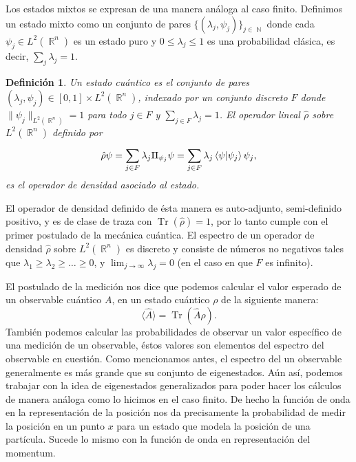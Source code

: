 \documentclass[a4paper]{report}
\DeclareMathOperator{\R}{\mathbb{R}}
\DeclareMathOperator{\N}{\mathbb{N}}
\DeclareMathOperator{\Tr}{Tr}
\newtheorem{definition}{Definición}
\begin{document}
  Los estados mixtos se expresan de una manera análoga al
  caso finito. Definimos un estado mixto como un conjunto de
  pares $\{(\lambda_j,\psi_j)\}_{j \in \N}$ donde cada
  $\psi_j \in L^2(\R^{n})$ es un estado puro y $0 \leq
  \lambda_j \leq 1$ es una probabilidad clásica, es decir,
  $\sum_j \lambda_j = 1$.
  \begin{definition}
    Un estado cuántico es el conjunto de pares $(\lambda_j,
    \psi_j) \in [0,1] \times L^2(\R^{n})$, indexado por un
    conjunto discreto $F$ donde $\|\psi_j\|_{L^2(\R^{n})} =
    1$ para todo $j \in F$ y $\sum_{j \in F} \lambda_j = 1$.
    El operador lineal $\hat{\rho}$ sobre $L^2(\R^{n})$
    definido por
    \begin{equation}
      \hat{\rho} \psi
      = \sum_{j \in F}^{} \lambda_j \Pi_{\psi_j} \psi
      = \sum_{j \in F}^{} \lambda_j \braket{\psi| \psi_j}
      \psi_j,
    \end{equation}
    es el operador de densidad asociado al estado. 
  \end{definition}
  El operador de densidad definido de ésta manera es
  auto-adjunto, semi-definido positivo, y es de clase de
  traza con $\Tr(\hat{\rho}) = 1$, por lo tanto cumple con
  el primer postulado de la mecánica cuántica. El espectro
  de un operador de densidad $\hat{\rho}$ sobre
  $L^2(\R^{n})$ es discreto y consiste de números no
  negativos tales que $\lambda_1 \geq \lambda_2 \geq \ldots
  \geq 0$, y $\lim_{j \to \infty} \lambda_j = 0$ (en el caso
  en que $F$ es infinito).

  El postulado de la medición nos dice que podemos calcular
  el valor esperado de un observable cuántico $A$, en un
  estado cuántico $\rho$ de la siguiente manera:
  \begin{equation}
    \langle \hat A \rangle = \Tr(\hat A \rho).
  \end{equation}
  También podemos calcular las probabilidades de observar un
  valor específico de una medición de un observable, éstos
  valores son elementos del espectro del observable en
  cuestión.  Como mencionamos antes, el espectro del un
  observable generalmente es más grande que su conjunto de
  eigenestados. Aún así, podemos trabajar con la idea de
  eigenestados generalizados para poder hacer los cálculos
  de manera análoga como lo hicimos en el caso finito. De
  hecho la función de onda en la representación de la
  posición nos da precisamente la probabilidad de medir la
  posición en un punto $x$ para un estado que modela la
  posición de una partícula. Sucede lo mismo con la función
  de onda en representación del momentum.
  
\end{document}
